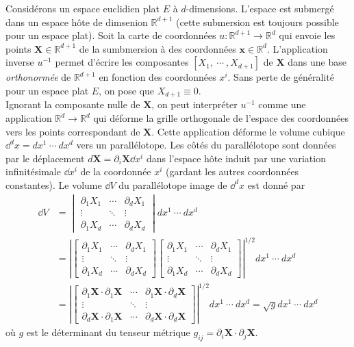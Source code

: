 Considérons un espace euclidien plat $E$ à $d$-dimensions. L'espace est submergé dans un espace hôte de dimsenion $\mathbb{R}^{d+1}$ (cette submersion est toujours possible pour un espace plat). Soit la carte de coordonnées $u : \mathbb{R}^{d+1} \to \mathbb{R}^d$ qui envoie les points $\mathbf{X}\in \mathbb{R}^{d+1}$ de la sumbmersion à des coordonnées $\mathbf{x} \in \mathbb{R}^{d}$. L'application inverse $u^{-1}$ permet d'écrire les composantes $[X_1, \ \cdots \ , X_{d+1}]$ de $\mathbf{X}$ dans une base \textit{orthonormée} de $\mathbb{R}^{d+1}$ en fonction des coordonnées $x^i$. Sans perte de généralité pour un espace plat $E$, on pose que $X_{d+1} \equiv 0$.\\

Ignorant la composante nulle de $\mathbf{X}$, on peut interpréter $u^{-1}$ comme une application $\mathbb{R}^d \to \mathbb{R}^d$ qui déforme la grille orthogonale de l'espace des coordonnées vers les points correspondant de $\mathbf{X}$. Cette application déforme le volume cubique $\dd^d x = dx^1 \ \cdots \ dx^d$ vers un parallélotope. Les côtés du parallélotope sont données par le déplacement $d\mathbf{X} = \partial_i \mathbf{X} \dd x^i$ dans l'espace hôte induit par une variation infinitésimale $\dd x^i$ de la coordonnée $x^i$ (gardant les autres coordonnées constantes). Le volume $\dd V$ du parallélotope image de $\dd^d x$ est donné par 
\begin{align*}
    \dd V  &= 
    \begin{vmatrix}
        \partial_1 X_1 & \cdots & \partial_d X_1\\
        \vdots & \ddots & \vdots \\
        \partial_1 X_d & \cdots & \partial_d X_d
    \end{vmatrix}
    dx^1 \ \cdots \ dx^d\\
    &= \left|\begin{bmatrix}
        \partial_1 X_1 & \cdots & \partial_d X_1\\
        \vdots & \ddots & \vdots \\
        \partial_1 X_d & \cdots & \partial_d X_d
    \end{bmatrix} \begin{bmatrix}
        \partial_1 X_1 & \cdots & \partial_d X_1\\
        \vdots & \ddots & \vdots \\
        \partial_1 X_d & \cdots & \partial_d X_d
    \end{bmatrix}\right|^{1/2}
    dx^1 \ \cdots \ dx^d
    \\
    &= \left|\begin{bmatrix}
        \partial_1 \mathbf{X} \cdot \partial_1 \mathbf{X}  & \cdots & \partial_1 \mathbf{X} \cdot \partial_d \mathbf{X}\\
        \vdots & \ddots & \vdots \\
        \partial_d \mathbf{X} \cdot \partial_1 \mathbf{X} & \cdots & \partial_d \mathbf{X} \cdot \partial_d \mathbf{X}
    \end{bmatrix} \right|^{1/2}
    dx^1 \ \cdots \ dx^d = \sqrt{g} dx^1 \ \cdots \ dx^d
\end{align*}   
où $g$ est le déterminant du tenseur métrique $g_{ij} = \partial_i \mathbf{X} \cdot \partial_j \mathbf{X}$. 

